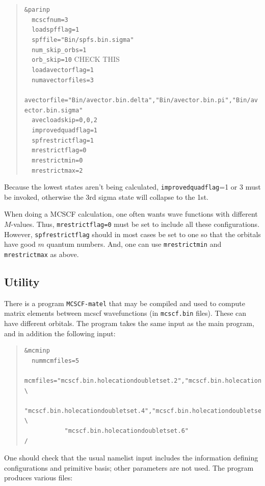 \documentclass[10pt,leqno, oneside]{book}
\begin{document}
\begin{quote}
{\footnotesize
\verb#&parinp# \\
\verb#  mcscfnum=3# \\
\verb#  loadspfflag=1# \\
\verb#  spffile="Bin/spfs.bin.sigma"# \\
\verb#  num_skip_orbs=1# \\
\verb#  orb_skip=10#   \qquad CHECK THIS \\
\verb#  loadavectorflag=1# \\
\verb#  numavectorfiles=3# \\
\verb#  avectorfile="Bin/avector.bin.delta","Bin/avector.bin.pi","Bin/avector.bin.sigma"# \\
\verb#  avecloadskip=0,0,2# \\
\verb#  improvedquadflag=1# \\
\verb#  spfrestrictflag=1 # \\
\verb#  mrestrictflag=0 # \\
\verb#  mrestrictmin=0 # \\
\verb#  mrestrictmax=2 # \\
}\end{quote}
Because the
lowest states aren't being calculated, \verb#improvedquadflag#=1 or 3 must be invoked, otherwise the 3rd sigma state will collapse to the 1st.

When doing a MCSCF calculation, one often wants wave functions with different $M$-values.  Thus, \verb#mrestrictflag=0# must be set to include all these configurations.  However, \verb#spfrestrictflag# should in most cases be set to one so that the orbitals have good $m$ quantum numbers.  And, one can use
\verb#mrestrictmin# and \verb#mrestrictmax# as above.

\subsection{Utility}

There is a program \verb#MCSCF-matel# that may be compiled and used to compute matrix elements between mcscf wavefunctions (in \verb#mcscf.bin#
files).  These can have different orbitals.  The program takes the same input as the main program, and in addition the following input:
%
\begin{quote}{\footnotesize
\begin{verbatim}
&mcminp
  nummcmfiles=5
  mcmfiles="mcscf.bin.holecationdoubletset.2","mcscf.bin.holecationdoubletset.3", \
           "mcscf.bin.holecationdoubletset.4","mcscf.bin.holecationdoubletset.5", \
           "mcscf.bin.holecationdoubletset.6"
/
\end{verbatim}}
\end{quote}
One should check that the usual namelist input includes the information defining configurations and primitive basis; other parameters are not used.
The program produces various files:  \\
\end{document}
